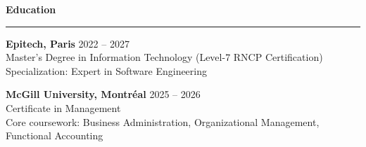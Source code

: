 \documentclass[9pt]{extarticle}
\begin{document}
\par\vspace{8pt}


{\large\bfseries Education}
\par\vspace{-8pt}
\rule{\linewidth}{0.4pt}
\par\vspace{5pt}

{\bfseries Epitech, Paris} \hfill 2022 -- 2027 \\
Master's Degree in Information Technology (Level-7 RNCP Certification) \\
Specialization: Expert in Software Engineering

\vspace{6pt}

{\bfseries McGill University, Montréal} \hfill 2025 -- 2026 \\
Certificate in Management \\
Core coursework: Business Administration, Organizational Management, Functional Accounting
\end{document}
